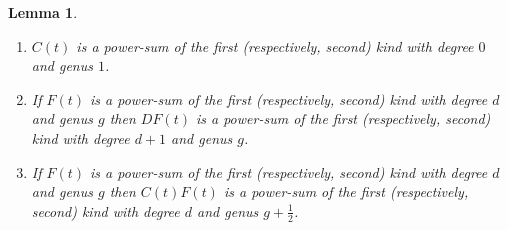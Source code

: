 \documentclass[12pt]{amsart}
\theoremstyle{plain}
\newtheorem{lemma}{Lemma}[section]
\theoremstyle{remark}
\begin{document}
\begin{lemma}
\label{lem:nice}
\
\begin{enumerate}[label=(\alph*)]
  \item \label{case1}
  $C(t)$ is a power-sum of the
first (respectively, second) kind with degree $0$ and genus $1$.
  \item \label{case1.5}
If $F(t)$ is a  power-sum of the
first (respectively, second) kind with degree $d$ and
genus $g$ then $D F(t)$ is a power-sum of the
first (respectively, second) kind with degree
$d+1$ and genus $g$.
  \item \label{case2}
If $F(t)$ is a power-sum of the
first (respectively, second) kind with degree $d$ and genus
$g$ then $C(t) F(t)$
is a power-sum of the
first (respectively, second) kind with degree $d$ and genus
$g+\frac{1}{2}$.
\end{enumerate}
\end{lemma}
\end{document}
